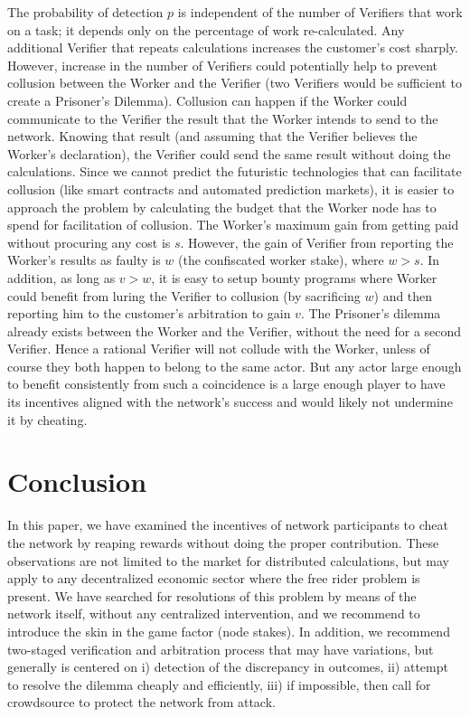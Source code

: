 \documentclass[conference]{IEEEtran}
\begin{document}
The probability of detection $p$ is independent of the number of Verifiers that work on a task; it depends only on the percentage of work re-calculated. Any additional Verifier that repeats calculations increases the customer's cost sharply. However, increase in the number of Verifiers could potentially help to prevent collusion between the Worker and the Verifier (two Verifiers would be sufficient to create a Prisoner's Dilemma). Collusion can happen if the Worker could communicate to the Verifier the result that the Worker intends to send to the network. Knowing that result (and assuming that the Verifier believes the Worker's declaration), the Verifier could send the same result without doing the calculations. Since we cannot predict the futuristic technologies that can facilitate collusion (like smart contracts and automated prediction markets), it is easier to approach the problem by calculating the budget that the Worker node has to spend for facilitation of collusion. The Worker's maximum gain from getting paid without procuring any cost is $s$. However, the gain of Verifier from reporting the Worker's results as faulty is $w$ (the confiscated worker stake), where $w>s$. In addition, as long as $v>w$, it is easy to setup bounty programs where Worker could benefit from luring the Verifier to collusion (by sacrificing $w$) and then reporting him to the customer's arbitration to gain $v$. The Prisoner's dilemma already exists between the Worker and the Verifier, without the need for a second Verifier. Hence a rational Verifier will not collude with the Worker, unless of course they both happen to belong to the same actor. But any actor large enough to benefit consistently from such a coincidence is a large enough player to have its incentives aligned with the network's success and would likely not undermine it by cheating.

\section{Conclusion}

In this paper, we have examined the incentives of network participants to cheat the network by reaping rewards without doing the proper contribution. These observations are not limited to the market for distributed calculations, but may apply to any decentralized economic sector where the free rider problem is present. We have searched for resolutions of this problem by means of the network itself, without any centralized intervention, and we recommend to introduce the skin in the game factor (node stakes). In addition, we recommend two-staged verification and arbitration process that may have variations, but generally is centered on i) detection of the discrepancy in outcomes, ii) attempt to resolve the dilemma cheaply and efficiently, iii) if impossible, then call for crowdsource to protect the network from attack.
\end{document}
